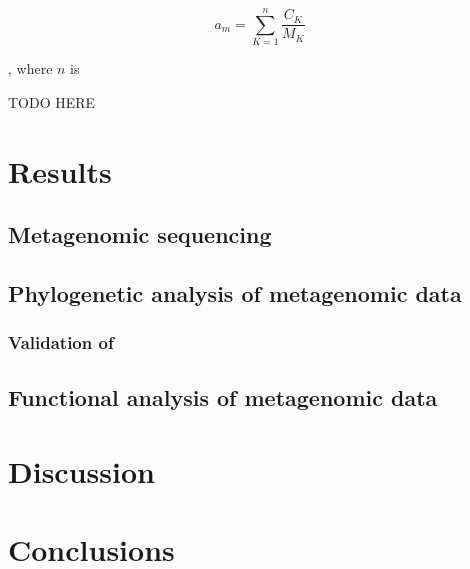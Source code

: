 \[
a_{m}=\sum_{K=1}^{n}\frac{C_{K}}{M_K}
\]

, where $n$ is 

TODO HERE 
\section{Results}
\subsection{Metagenomic sequencing}
\subsection{Phylogenetic analysis of metagenomic data}
\subsubsection{Validation of }
\subsection{Functional analysis of metagenomic data}

\section{Discussion}

\section{Conclusions}


